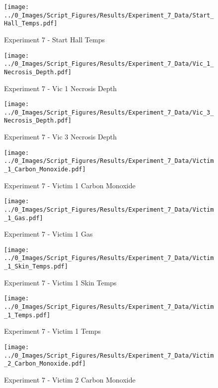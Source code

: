 	\clearpage

	\begin{figure}[H]
		\centering
		\texttt{[image: ../0\_Images/Script\_Figures/Results/Experiment\_7\_Data/Start\_Hall\_Temps.pdf]}
		\caption[]{Experiment 7 - Start Hall Temps}
	\end{figure}
 

	\begin{figure}[H]
		\centering
		\texttt{[image: ../0\_Images/Script\_Figures/Results/Experiment\_7\_Data/Vic\_1\_Necrosis\_Depth.pdf]}
		\caption[]{Experiment 7 - Vic 1 Necrosis Depth}
	\end{figure}
 
	\clearpage

	\begin{figure}[H]
		\centering
		\texttt{[image: ../0\_Images/Script\_Figures/Results/Experiment\_7\_Data/Vic\_3\_Necrosis\_Depth.pdf]}
		\caption[]{Experiment 7 - Vic 3 Necrosis Depth}
	\end{figure}
 

	\begin{figure}[H]
		\centering
		\texttt{[image: ../0\_Images/Script\_Figures/Results/Experiment\_7\_Data/Victim\_1\_Carbon\_Monoxide.pdf]}
		\caption[]{Experiment 7 - Victim 1 Carbon Monoxide}
	\end{figure}
 
	\clearpage

	\begin{figure}[H]
		\centering
		\texttt{[image: ../0\_Images/Script\_Figures/Results/Experiment\_7\_Data/Victim\_1\_Gas.pdf]}
		\caption[]{Experiment 7 - Victim 1 Gas}
	\end{figure}
 

	\begin{figure}[H]
		\centering
		\texttt{[image: ../0\_Images/Script\_Figures/Results/Experiment\_7\_Data/Victim\_1\_Skin\_Temps.pdf]}
		\caption[]{Experiment 7 - Victim 1 Skin Temps}
	\end{figure}
 
	\clearpage

	\begin{figure}[H]
		\centering
		\texttt{[image: ../0\_Images/Script\_Figures/Results/Experiment\_7\_Data/Victim\_1\_Temps.pdf]}
		\caption[]{Experiment 7 - Victim 1 Temps}
	\end{figure}
 

	\begin{figure}[H]
		\centering
		\texttt{[image: ../0\_Images/Script\_Figures/Results/Experiment\_7\_Data/Victim\_2\_Carbon\_Monoxide.pdf]}
		\caption[]{Experiment 7 - Victim 2 Carbon Monoxide}
	\end{figure}
 
